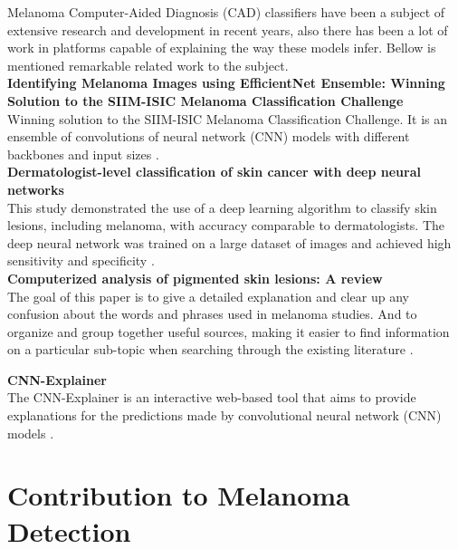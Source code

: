 Melanoma Computer-Aided Diagnosis (CAD) classifiers have been a subject of extensive research and development in recent years,
also there has been a lot of work in platforms capable of explaining the way these models infer.
Bellow is mentioned remarkable related work to the subject. \\

\vspace{0.5cm}
\textbf{Identifying Melanoma Images using EfficientNet Ensemble: Winning Solution to the SIIM-ISIC Melanoma Classification Challenge} \\

Winning solution to the SIIM-ISIC Melanoma Classification Challenge. It is an ensemble of convolutions of neural network (CNN) models with different backbones and input sizes \cite{WinningISIC}.  \\

\vspace{0.5cm}
\textbf{Dermatologist-level classification of skin cancer with deep neural networks} \\

This study demonstrated the use of a deep learning algorithm to classify skin lesions, including melanoma, with accuracy comparable to dermatologists. The deep neural network was trained on a large dataset of images and achieved high sensitivity and specificity \cite{SkinCancerDeepNN}. \\

\vspace{0.5cm}
\textbf{Computerized analysis of pigmented skin lesions: A review}  \\

The goal of this paper is to give a detailed explanation and clear up any confusion about the words and phrases used in melanoma studies. And to organize and group together useful sources, making it easier to find information on a particular sub-topic when searching through the existing literature \cite{MelanomaTopicsReview}. \\

\newpage

\vspace{0.5cm}
\textbf{CNN-Explainer} \\

The CNN-Explainer is an interactive web-based tool that aims to provide explanations for the predictions made by convolutional neural network (CNN) models \cite{CNNExplainer}.

\section{Contribution to Melanoma Detection}

